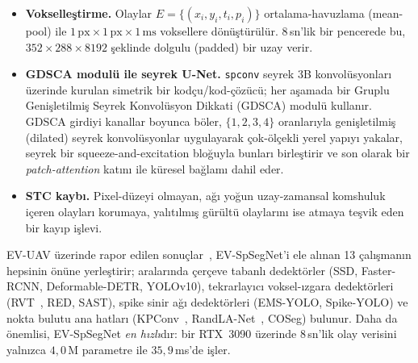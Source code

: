 \documentclass[11pt,a4paper]{article}
\begin{document}
\begin{itemize}
\setlength\itemsep{0.2em}
  \item \textbf{Vokselle\c{s}tirme.} Olaylar
        $E = \{(x_i, y_i, t_i, p_i)\}$ ortalama-havuzlama (mean-pool)
        ile $1\,\text{px} \times 1\,\text{px} \times 1\,\text{ms}$
        voksellere d\"on\"u\c{s}t\"ur\"ul\"ur. 8\,sn'lik bir pencerede
        bu, $352 \times 288 \times 8192$ \c{s}eklinde dolgulu
        (padded) bir uzay verir.
  \item \textbf{GDSCA modul\"u ile seyrek U-Net.}
        \texttt{spconv} seyrek 3B konvol\"usyonlar{\i} \"uzerinde
        kurulan simetrik bir kod\c{c}u/kod-\c{c}\"oz\"uc\"u; her
        a\c{s}amada bir Gruplu Geni\c{s}letilmi\c{s} Seyrek
        Konvol\"usyon Dikkati (GDSCA) modul\"u kullan{\i}r. GDSCA
        girdiyi kanallar boyunca b\"oler, $\{1,2,3,4\}$ oranlar{\i}yla
        geni\c{s}letilmi\c{s} (dilated) seyrek konvol\"usyonlar
        uygulayarak \c{c}ok-\"ol\c{c}ekli yerel yap{\i}y{\i} yakalar,
        seyrek bir squeeze-and-excitation blo\u{g}uyla bunlar{\i}
        birle\c{s}tirir ve son olarak bir \emph{patch-attention}
        kat{\i}n{\i} ile k\"uresel ba\u{g}lam{\i} dahil eder.
  \item \textbf{STC kayb{\i}.} Pixel-d\"uzeyi olmayan, a\u{g}{\i}
        yo\u{g}un uzay-zamansal komshuluk i\c{c}eren olaylar{\i}
        korumaya, yal{\i}t{\i}lm{\i}\c{s} g\"ur\"ult\"u olaylar{\i}n{\i}
        ise atmaya te\c{s}vik eden bir kay{\i}p i\c{s}levi.
\end{itemize}

EV-UAV \"uzerinde rapor edilen
sonu\c{c}lar~\cite{chen2025evspsegnet}, EV-SpSegNet'i ele al{\i}nan
13 \c{c}al{\i}\c{s}man{\i}n hepsinin \"on\"une yerle\c{s}tirir; aralar{\i}nda
\c{c}er\c{c}eve tabanl{\i} dedekt\"orler (SSD, Faster-RCNN,
Deformable-DETR, YOLOv10), tekrarlay{\i}c{\i} voksel-{\i}zgara
dedekt\"orleri (RVT~\cite{gehrig2023rvt}, RED, SAST), spike sinir
a\u{g}{\i} dedekt\"orleri (EMS-YOLO, Spike-YOLO) ve nokta bulutu
ana hatlar{\i} (KPConv~\cite{thomas2019kpconv},
RandLA-Net~\cite{hu2020randla}, COSeg) bulunur. Daha da \"onemlisi,
EV-SpSegNet \emph{en h{\i}zl{\i}}d{\i}r: bir RTX~3090 \"uzerinde
$8$\,sn'lik olay verisini yaln{\i}zca $4{,}0$\,M parametre ile
$35{,}9$\,ms'de i\c{s}ler.
\end{document}
